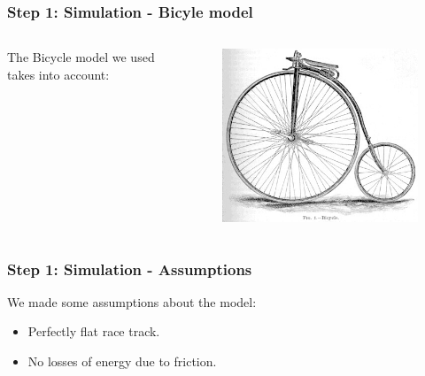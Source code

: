\documentclass{beamer}
\begin{document}
\begin{frame}
\frametitle{Step 1: Simulation - Bicyle model}
\begin{columns}
  
  \begin{column}{0.6\textwidth}
  The Bicycle model we used takes into account:
  \begin{itemize}
    \vspace{0.7cm}
  \end{itemize}
  \end{column}

  \begin{column}{0.4\textwidth}
    \begin{figure}[ht!]
      \includegraphics[scale=0.3]{bicycle.jpg}
    \end{figure} 
  \end{column}

\end{columns}
\end{frame}

\begin{frame}
\frametitle{Step 1: Simulation - Assumptions}
We made some assumptions about the model:
\vspace{0.7cm}
\pause
\begin{itemize}
\item Perfectly flat race track.
\pause
\vspace{0.7cm}
\item No losses of energy due to friction.
\end{itemize}
\end{frame}
\end{document}
